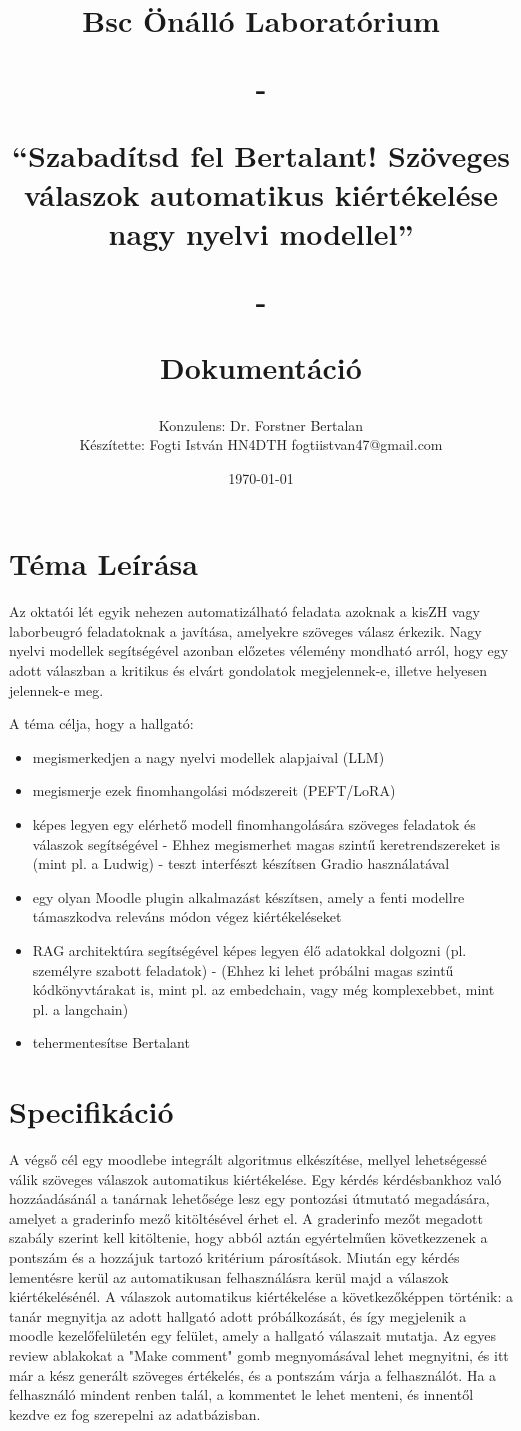 \documentclass{article}
\title{
\Huge
Bsc Önálló Laboratórium

-

“Szabadítsd fel Bertalant! Szöveges válaszok automatikus kiértékelése nagy nyelvi modellel”

-

Dokumentáció
}
\author{\Large Konzulens: Dr. Forstner Bertalan\\
\Large Készítette: Fogti István HN4DTH fogtiistvan47@gmail.com\\}
\date{\today}
\begin{document}
\maketitle
\thispagestyle{empty}
\newpage

\section{Téma Leírása}
Az oktatói lét egyik nehezen automatizálható feladata azoknak a kisZH vagy laborbeugró feladatoknak a javítása, amelyekre szöveges válasz érkezik. Nagy nyelvi modellek segítségével azonban előzetes vélemény mondható arról, hogy egy adott válaszban a kritikus és elvárt gondolatok megjelennek-e, illetve helyesen jelennek-e meg.

\noindent A téma célja, hogy a hallgató:

\begin{itemize}
    \item megismerkedjen a nagy nyelvi modellek alapjaival (LLM)
    \item megismerje ezek finomhangolási módszereit (PEFT/LoRA)
    \item képes legyen egy elérhető modell finomhangolására szöveges feladatok és válaszok segítségével - Ehhez megismerhet magas szintű keretrendszereket is (mint pl. a Ludwig) - teszt interfészt készítsen Gradio használatával
    \item egy olyan Moodle plugin alkalmazást készítsen, amely a fenti modellre támaszkodva releváns módon végez kiértékeléseket
    \item RAG architektúra segítségével képes legyen élő adatokkal dolgozni (pl. személyre szabott feladatok) - (Ehhez ki lehet próbálni magas szintű kódkönyvtárakat is, mint pl. az embedchain, vagy még komplexebbet, mint pl. a langchain)
    \item tehermentesítse Bertalant
\end{itemize}


\section{Specifikáció}
A végső cél egy moodlebe integrált algoritmus elkészítése, mellyel lehetségessé válik szöveges válaszok automatikus kiértékelése. Egy kérdés kérdésbankhoz való hozzáadásánál a tanárnak lehetősége lesz egy pontozási útmutató megadására, amelyet a graderinfo mező kitöltésével érhet el. A graderinfo mezőt megadott szabály szerint kell kitöltenie, hogy abból aztán egyértelműen következzenek a pontszám és a hozzájuk tartozó kritérium párosítások. Miután egy kérdés lementésre kerül az automatikusan felhasználásra kerül majd a válaszok kiértékelésénél. A válaszok automatikus kiértékelése a következőképpen történik: a tanár megnyitja az adott hallgató adott próbálkozását,
és így megjelenik a moodle kezelőfelületén egy felület, amely a hallgató válaszait mutatja. Az egyes review ablakokat a "Make comment" gomb megnyomásával lehet megnyitni, és itt már a kész generált szöveges értékelés, és a pontszám várja a felhasználót.
Ha a felhasználó mindent renben talál, a kommentet le lehet menteni, és innentől kezdve ez fog szerepelni az adatbázisban.
\end{document}
